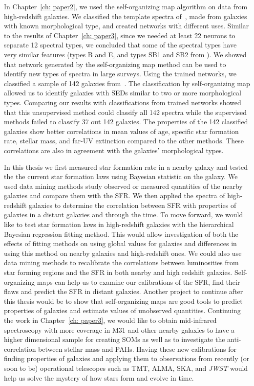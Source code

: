In Chapter~\ref{ch: paper2}, we used the self-organizing map algorithm on data from high-redshift galaxies.
We classified the template spectra of~\citet{Kinney96}, made from galaxies with known morphological type, and created networks with different uses.
Similar to the results of Chapter~\ref{ch: paper3}, since we needed at least 22 neurons to separate 12 spectral types, we concluded that some of the spectral types have very similar features (types B and E, and types SB1 and SB2 from \citealt{Kinney96}).
We showed that network generated by the self-organizing map method can be used to identify new types of spectra in large surveys.
Using the trained networks, we classified a sample of 142 galaxies from~\citet{Hossein12}.
The classification by self-organizing map allowed us to identify galaxies with SEDs similar to two or more morphological types.
Comparing our results with classifications from trained networks showed that this unsupervised method could classify all 142 spectra while the supervised methods failed to classify 37 out 142 galaxies. 
The properties of the 142 classified galaxies show better correlations in mean values of age, specific star formation rate, stellar mass, and far-UV extinction compared to the other methods.
These correlations are also in agreement with the galaxies' morphological types.

In this thesis we first measured star formation rate in a nearby galaxy and tested the the current star formation laws using Bayesian statistic on the galaxy.
We used data mining methods study  observed or measured quantities of the nearby galaxies and compare them with the SFR.
We then applied the spectra of high-redshift galaxies to determine the correlation between SFR with properties of galaxies in a distant galaxies and through the time.
To move forward, we would like to test star formation laws in high-redshift galaxies with the hierarchical Bayesian regression fitting method. This would allow investigation of both the effects of fitting methods on using global values for galaxies and differences in using this method on nearby galaxies and high-redshift ones.  
We could also use data mining methods to recalibrate the correlations between luminosities from star forming regions and the SFR in both nearby and high redshift galaxies.
Self-organizing maps can help us to examine our calibrations of the SFR, find their flaws and predict the SFR in distant galaxies.
Another project to continue after this thesis would be to show that self-organizing maps are good tools to predict properties of galaxies and estimate values of unobserved quantities.
Continuing the work in Chapter~\ref{ch: paper3}, we would like to obtain mid-infrared spectroscopy with more coverage in M31 and other nearby galaxies to have a higher dimensional sample for creating SOMs as well as to investigate the anti-correlation between stellar mass and PAHs.
Having these new calibrations for finding properties of galaxies and applying them to observations from recently (or soon to be) operational telescopes such as TMT, ALMA, SKA, and {\it JWST} would help us solve the mystery of how stars form and evolve in time.





